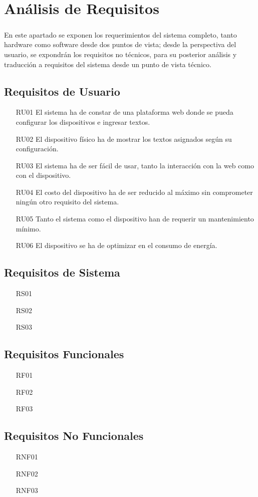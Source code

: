 \chapter{Análisis de Requisitos}
\label{analisis_de_requisitos}

\paragraph{} En este apartado se exponen los requerimientos del sistema completo, tanto hardware como software desde dos puntos de vista; desde la perspectiva del usuario, se expondrán los requisitos no técnicos, para su posterior análisis y traducción a requisitos del sistema desde un punto de vista técnico.

\section{Requisitos de Usuario}
\begin{itemize}
    \item [RU01] El sistema ha de constar de una plataforma web donde se pueda configurar los dispositivos e ingresar textos. 
    \item [RU02] El dispositivo físico ha de mostrar los textos asignados según su configuración.
    \item [RU03] El sistema ha de ser fácil de usar, tanto la interacción con la web como con el dispositivo.
    \item [RU04] El costo del dispositivo ha de ser reducido al máximo sin comprometer ningún otro requisito del sistema.
    \item [RU05] Tanto el sistema como el dispositivo han de requerir un mantenimiento mínimo.
    \item [RU06] El dispositivo se ha de optimizar en el consumo de energía.
\end{itemize}

\section{Requisitos de Sistema}
\begin{itemize}
    \item [RS01] 
    \item [RS02] 
    \item [RS03]
\end{itemize}

\section{Requisitos Funcionales}
\begin{itemize}
    \item [RF01] 
    \item [RF02] 
    \item [RF03]
\end{itemize}

\section{Requisitos No Funcionales}
\begin{itemize}
    \item [RNF01] 
    \item [RNF02] 
    \item [RNF03]
\end{itemize}